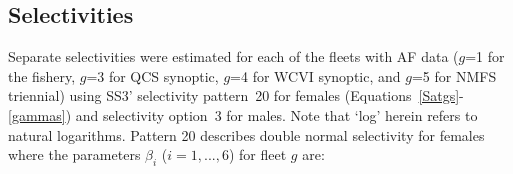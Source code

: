 \documentclass[11pt]{book}
\begin{document}
\subsection{Selectivities} \label{ss:select}

Separate selectivities were estimated for each of the fleets with AF data ($g$=1 for the fishery, $g$=3 for QCS synoptic, $g$=4 for WCVI synoptic, and $g$=5 for NMFS triennial) using SS3' selectivity pattern~20 for females (Equations~\ref{Satgs}-\ref{gammas}) and selectivity option~3 for males.
Note that `log' herein refers to natural logarithms. %
Pattern 20 describes double normal selectivity for females where the parameters $\beta_i$ ($i=1,...,6$) for fleet $g$ are:
\end{document}
